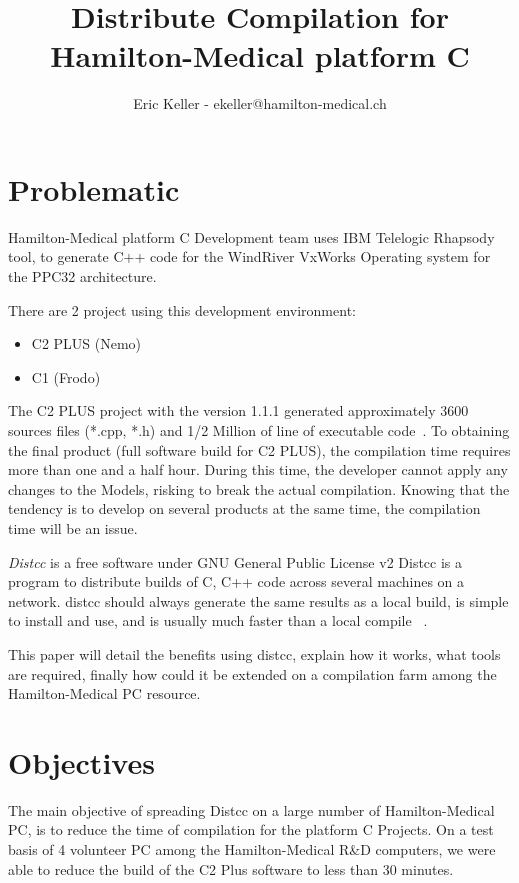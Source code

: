 \documentclass{article}
\title{Distribute Compilation for Hamilton-Medical platform C}
\author{Eric Keller - ekeller@hamilton-medical.ch}
\begin{document}
\maketitle
\tableofcontents
\newpage

\section{Problematic}

Hamilton-Medical platform C Development team uses IBM Telelogic Rhapsody tool, to generate C++ code for the WindRiver VxWorks Operating system for the PPC32 architecture.

There are 2 project using this development environment: 
\begin{itemize}
  \item C2 PLUS (Nemo)
  \item C1 (Frodo)
\end{itemize}

The C2 PLUS project with the version 1.1.1 generated approximately 3600 sources
files (*.cpp, *.h) and 1/2 Million of line of executable code~\cite{Locmetrics}. 
To obtaining the final product (full software build for C2 PLUS), the
compilation time requires more than one and a half hour. During this time, the
developer cannot apply any changes to the Models, risking to break the actual compilation. Knowing that the tendency is to develop on several products at the same time, the compilation time will be an issue.

\emph{Distcc} is a free software under GNU General Public License v2
Distcc is a program to distribute builds of C, C++ code across several machines on a network.
distcc should always generate the same results as a local build, is simple to install and use, 
and is usually much faster than a local compile ~\cite{distcc-samba}.

This paper will detail the benefits using distcc, explain how it works,
what tools are required, finally how could it be extended on a compilation farm
among the Hamilton-Medical PC resource.

\section{Objectives}

The main objective of spreading Distcc on a large number of Hamilton-Medical PC,
is to reduce the time of compilation for the platform C Projects.
On a test basis of 4 volunteer PC among the Hamilton-Medical R\&D computers, we
were able to reduce the build of the C2 Plus software to less than 30 minutes.
\end{document}
